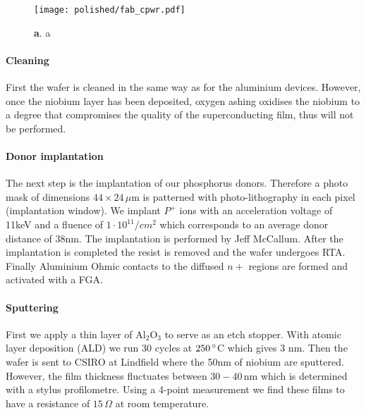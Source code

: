 \begin{figure}
	\centering
	\texttt{[image: polished/fab\_cpwr.pdf]}
	\caption[SEM FF]{\textbf{a}. a }
	\label{fig:fab_cpwr}
\end{figure}

\paragraph*{Cleaning} 
First the wafer is cleaned in the same way as for the aluminium devices. However, once the niobium layer has been deposited, oxygen ashing oxidises the niobium to a degree that compromises the quality of the superconducting film, thus will not be performed.

\paragraph*{Donor implantation}
The next step is the implantation of our phosphorus donors. Therefore a photo mask of dimensions  $44\times24\,\mu$m is patterned with photo-lithography in each pixel (implantation window). We implant $P^+$ ions with an acceleration voltage of 11keV and a fluence of $1\cdot 10^{11}/cm^2$ which corresponds to an average donor distance of 38nm. The implantation is performed by Jeff McCallum. After the implantation is completed the resist is removed and the wafer undergoes RTA. Finally Aluminium Ohmic contacts to the diffused $n+$ regions are formed and activated with a FGA.

\paragraph*{Sputtering}
First we apply a thin layer of Al$_2$O$_3$ to serve as an etch stopper. With atomic layer deposition (ALD) we run 30 cycles at $250\,\degree$C which gives 3 nm. 
Then the wafer is sent to CSIRO at Lindfield where the 50nm of niobium are sputtered. However, the film thickness fluctuates between $30-40\,$nm which is determined with a stylus profilometre. Using a 4-point measurement we find these films to have a resistance of $15\,\Omega$ at room temperature. 

